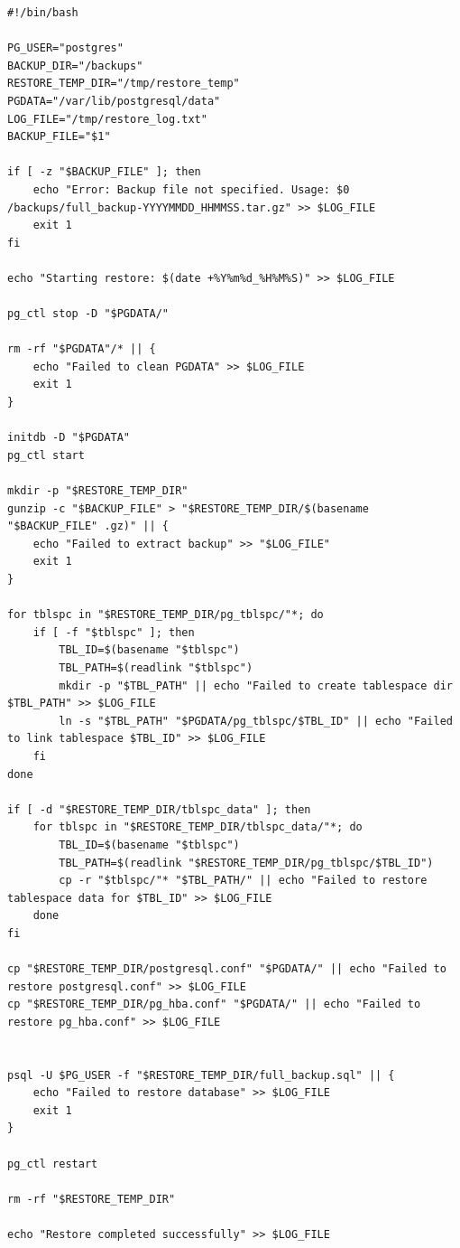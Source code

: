 \documentclass{article}
\begin{document}
\begin{lstlisting}[caption={kitty}, label={lst:example}]
#!/bin/bash

PG_USER="postgres"
BACKUP_DIR="/backups"
RESTORE_TEMP_DIR="/tmp/restore_temp"
PGDATA="/var/lib/postgresql/data"
LOG_FILE="/tmp/restore_log.txt"
BACKUP_FILE="$1"

if [ -z "$BACKUP_FILE" ]; then
    echo "Error: Backup file not specified. Usage: $0 /backups/full_backup-YYYYMMDD_HHMMSS.tar.gz" >> $LOG_FILE
    exit 1
fi

echo "Starting restore: $(date +%Y%m%d_%H%M%S)" >> $LOG_FILE

pg_ctl stop -D "$PGDATA/"  

rm -rf "$PGDATA"/* || {
    echo "Failed to clean PGDATA" >> $LOG_FILE
    exit 1
}

initdb -D "$PGDATA"
pg_ctl start

mkdir -p "$RESTORE_TEMP_DIR"
gunzip -c "$BACKUP_FILE" > "$RESTORE_TEMP_DIR/$(basename "$BACKUP_FILE" .gz)" || {
    echo "Failed to extract backup" >> "$LOG_FILE"
    exit 1
}

for tblspc in "$RESTORE_TEMP_DIR/pg_tblspc/"*; do
    if [ -f "$tblspc" ]; then
        TBL_ID=$(basename "$tblspc")
        TBL_PATH=$(readlink "$tblspc")
        mkdir -p "$TBL_PATH" || echo "Failed to create tablespace dir $TBL_PATH" >> $LOG_FILE
        ln -s "$TBL_PATH" "$PGDATA/pg_tblspc/$TBL_ID" || echo "Failed to link tablespace $TBL_ID" >> $LOG_FILE
    fi
done

if [ -d "$RESTORE_TEMP_DIR/tblspc_data" ]; then
    for tblspc in "$RESTORE_TEMP_DIR/tblspc_data/"*; do
        TBL_ID=$(basename "$tblspc")
        TBL_PATH=$(readlink "$RESTORE_TEMP_DIR/pg_tblspc/$TBL_ID")
        cp -r "$tblspc/"* "$TBL_PATH/" || echo "Failed to restore tablespace data for $TBL_ID" >> $LOG_FILE
    done
fi

cp "$RESTORE_TEMP_DIR/postgresql.conf" "$PGDATA/" || echo "Failed to restore postgresql.conf" >> $LOG_FILE
cp "$RESTORE_TEMP_DIR/pg_hba.conf" "$PGDATA/" || echo "Failed to restore pg_hba.conf" >> $LOG_FILE


psql -U $PG_USER -f "$RESTORE_TEMP_DIR/full_backup.sql" || {
    echo "Failed to restore database" >> $LOG_FILE
    exit 1
}

pg_ctl restart

rm -rf "$RESTORE_TEMP_DIR"

echo "Restore completed successfully" >> $LOG_FILE
\end{lstlisting}
\end{document}
